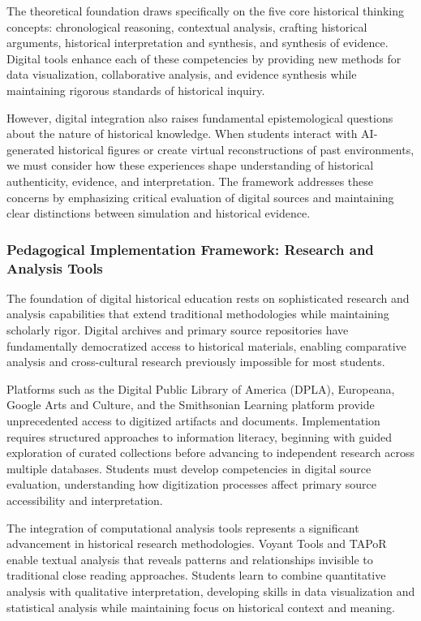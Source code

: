 The theoretical foundation draws specifically on the five core historical thinking concepts: chronological reasoning, contextual analysis, crafting historical arguments, historical interpretation and synthesis, and synthesis of evidence. Digital tools enhance each of these competencies by providing new methods for data visualization, collaborative analysis, and evidence synthesis while maintaining rigorous standards of historical inquiry.

However, digital integration also raises fundamental epistemological questions about the nature of historical knowledge. When students interact with AI-generated historical figures or create virtual reconstructions of past environments, we must consider how these experiences shape understanding of historical authenticity, evidence, and interpretation. The framework addresses these concerns by emphasizing critical evaluation of digital sources and maintaining clear distinctions between simulation and historical evidence.

\subsubsection {Pedagogical Implementation Framework: Research and Analysis Tools}

The foundation of digital historical education rests on sophisticated research and analysis capabilities that extend traditional methodologies while maintaining scholarly rigor. Digital archives and primary source repositories have fundamentally democratized access to historical materials, enabling comparative analysis and cross-cultural research previously impossible for most students.

Platforms such as the Digital Public Library of America (DPLA), Europeana, Google Arts and Culture, and the Smithsonian Learning platform provide unprecedented access to digitized artifacts and documents. Implementation requires structured approaches to information literacy, beginning with guided exploration of curated collections before advancing to independent research across multiple databases. Students must develop competencies in digital source evaluation, understanding how digitization processes affect primary source accessibility and interpretation.

The integration of computational analysis tools represents a significant advancement in historical research methodologies. Voyant Tools and TAPoR enable textual analysis that reveals patterns and relationships invisible to traditional close reading approaches. Students learn to combine quantitative analysis with qualitative interpretation, developing skills in data visualization and statistical analysis while maintaining focus on historical context and meaning.

